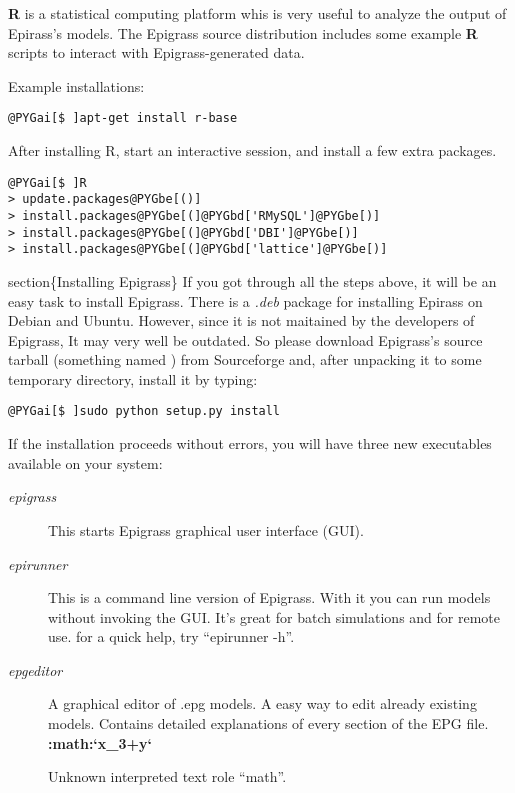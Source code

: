 \documentclass[a4paper,10pt]{manual}
\begin{document}
\textbf{R} is a statistical computing platform whis is very useful to analyze the output of Epirass's models. The Epigrass source distribution includes some example \textbf{R} scripts to interact with Epigrass-generated data.

Example installations:

\begin{Verbatim}[commandchars=@\[\]]
@PYGai[$ ]apt-get install r-base
\end{Verbatim}

After installing R, start an interactive session, and install a few extra packages.

\begin{Verbatim}[commandchars=@\[\]]
@PYGai[$ ]R
> update.packages@PYGbe[()]
> install.packages@PYGbe[(]@PYGbd['RMySQL']@PYGbe[)]
> install.packages@PYGbe[(]@PYGbd['DBI']@PYGbe[)]
> install.packages@PYGbe[(]@PYGbd['lattice']@PYGbe[)]
\end{Verbatim}

section\{Installing Epigrass\}
If you got through all the steps above, it will be an easy task to install Epigrass. There is a \emph{.deb} package for installing Epirass on Debian and Ubuntu. However, since it is not maitained by the developers of Epigrass, It may very well be outdated.  So please download Epigrass's source tarball (something named ) from Sourceforge and, after unpacking it to some temporary directory, install it by typing:

\begin{Verbatim}[commandchars=@\[\]]
@PYGai[$ ]sudo python setup.py install
\end{Verbatim}

If the installation proceeds without errors, you will have three new executables available on your system:
\begin{description}
\item[\emph{epigrass}]
This starts Epigrass graphical user interface (GUI).

\item[\emph{epirunner}]
This is a command line version of Epigrass. With it you can run models without invoking the GUI. It's great for batch simulations and for remote use. for a quick help, try ``epirunner -h''.

\item[\emph{epgeditor}]
A graphical editor of .epg models. A easy way to edit already existing models. Contains detailed explanations of every section of the EPG file. {\color{red}\bfseries{}:math:`x\_3+y`}

Unknown interpreted text role ``math''.


\end{description}
\end{document}
